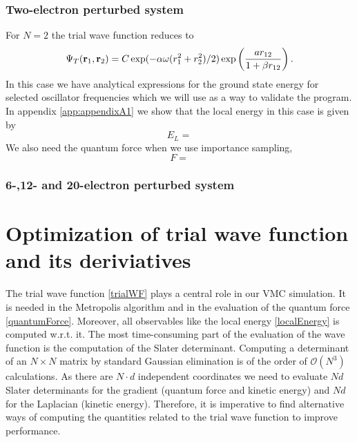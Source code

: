 \documentclass[english, a4paper]{article}
\begin{document}
\subsubsection{Two-electron perturbed system}
For $N=2$ the trial wave function reduces to
\begin{equation*}
 \Psi_T({\bf r}_1,{\bf r}_2) = C\exp(-\alpha \omega (r_1^2+r_2^2)/2)\exp\left(\frac{ar_{12}}{1+\beta r_{12}}\right).
 \label{trialWF2}
\end{equation*}
In this case we have analytical expressions for the ground state energy for selected oscillator
frequencies which we will use as a way to validate the program. In appendix \ref{app:appendixA1} we show
that the local energy in this case is given by
\begin{equation}
 E_L = 
\end{equation}
We also need the quantum force when we use importance sampling,
\begin{equation}
 F =
\end{equation}

\subsubsection{6-,12- and 20-electron perturbed system}

\section{Optimization of trial wave function and its deriviatives}
\label{sec:optimization}

The trial wave function \eqref{trialWF} plays a central role in our VMC simulation.
It is needed in the Metropolis algorithm and in the evaluation of the quantum force \eqref{quantumForce}.
Moreover, all observables like the local energy \eqref{localEnergy} is computed w.r.t. it. 
The most time-consuming part of the evaluation of the wave function is the computation of the Slater determinant. 
Computing a determinant of an $ N \times N$ matrix by standard Gaussian elimination is of the order of
$\mathcal{O}(N^3)$ calculations. As there are $N \cdot d$ independent coordinates we need to 
evaluate $Nd$ Slater determinants for the gradient (quantum force and kinetic energy) and $Nd$ for 
the Laplacian (kinetic energy). Therefore, it is imperative to find alternative ways of computing
the quantities related to the trial wave function to improve performance. \\
\end{document}
